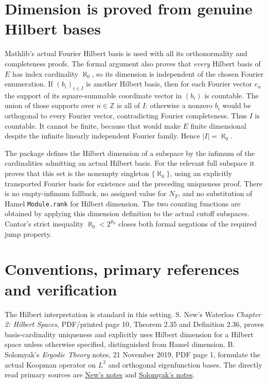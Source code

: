\documentclass[11pt]{article}
\begin{document}
\newpage
\section{Dimension is proved from genuine Hilbert bases}
Mathlib's actual Fourier Hilbert basis is used with all its
orthonormality and completeness proofs. The formal argument
also proves that \emph{every} Hilbert basis of $E$ has index
cardinality $\aleph_0$, so its dimension is independent of the
chosen Fourier enumeration. If $(b_i)_{i\in I}$ is another
Hilbert basis, then for each Fourier vector $e_n$ the support of
its square-summable coordinate vector in $(b_i)$ is countable.
The union of those supports over $n\in\mathbb Z$ is all of $I$:
otherwise a nonzero $b_i$ would be orthogonal to every Fourier
vector, contradicting Fourier completeness. Thus $I$ is
countable. It cannot be finite, because that would make $E$
finite dimensional despite the infinite linearly independent
Fourier family. Hence $|I|=\aleph_0$.

The package defines the Hilbert dimension of a subspace by the
infimum of the cardinalities admitting an actual Hilbert basis.
For the relevant full subspace it proves that this set is the
nonempty singleton $\{\aleph_0\}$, using an explicitly transported
Fourier basis for existence and the preceding uniqueness proof.
There is no empty-infimum fallback, no assigned value for $N_T$,
and no substitution of Hamel \texttt{Module.rank} for Hilbert
dimension. The two counting functions are obtained by applying
this dimension definition to the actual cutoff subspaces.
Cantor's strict inequality $\aleph_0<2^{\aleph_0}$ closes both
formal negations of the required jump property.

\section{Conventions, primary references and verification}
The Hilbert interpretation is standard in this setting.
S. New's Waterloo \emph{Chapter 2: Hilbert Spaces}, PDF/printed
page 10, Theorem 2.35 and Definition 2.36, proves basis-cardinality
uniqueness and explicitly uses Hilbert dimension for a Hilbert
space unless otherwise specified, distinguished from Hamel
dimension. B. Solomyak's \emph{Ergodic Theory} notes,
21 November 2019, PDF page 1, formulate the actual Koopman
operator on $L^2$ and orthogonal eigenfunction bases.
The directly read primary sources are
\href{https://www.math.uwaterloo.ca/~snew/PMATH453/Chap2HilbertSpaces.pdf}{New's notes}
and
\href{https://u.math.biu.ac.il/~solomyb/TEACH/20/ET/spectral.pdf}{Solomyak's notes}.
\end{document}
